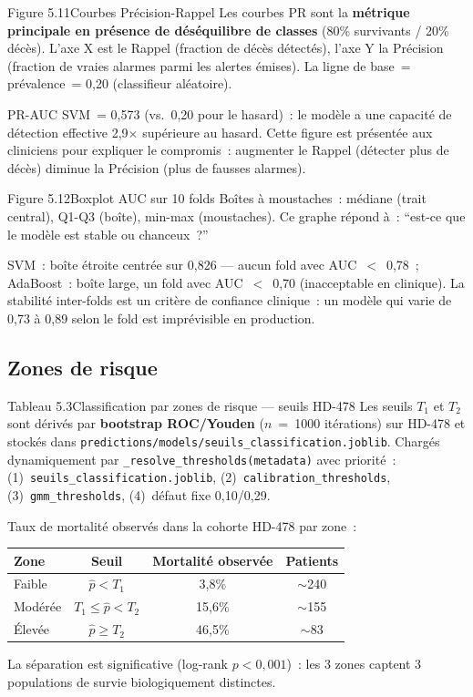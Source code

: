 \documentclass[12pt,a4paper]{article}
\begin{document}
\begin{figbox}{Figure 5.11}{Courbes Précision-Rappel}
Les courbes PR sont la \textbf{métrique principale en présence de déséquilibre
de classes} (80\% survivants / 20\% décès). L'axe X est le Rappel (fraction de
décès détectés), l'axe Y la Précision (fraction de vraies alarmes parmi les
alertes émises). La ligne de base~= prévalence~= 0{,}20 (classifieur aléatoire).

PR-AUC SVM~= 0{,}573 (vs.\ 0{,}20 pour le hasard)~: le modèle a une capacité
de détection effective 2{,}9$\times$ supérieure au hasard. Cette figure est
présentée aux cliniciens pour expliquer le compromis~: augmenter le Rappel
(détecter plus de décès) diminue la Précision (plus de fausses alarmes).
\end{figbox}

\begin{figbox}{Figure 5.12}{Boxplot AUC sur 10 folds}
Boîtes à moustaches~: médiane (trait central), Q1-Q3 (boîte), min-max (moustaches).
Ce graphe répond à~: ``est-ce que le modèle est stable ou chanceux~?''

SVM~: boîte étroite centrée sur 0{,}826 --- aucun fold avec AUC~$<$~0{,}78~;
AdaBoost~: boîte large, un fold avec AUC~$<$~0{,}70 (inacceptable en clinique).
La stabilité inter-folds est un critère de confiance clinique~: un modèle qui
varie de 0{,}73 à 0{,}89 selon le fold est imprévisible en production.
\end{figbox}

\subsection{Zones de risque}

\begin{figbox}{Tableau 5.3}{Classification par zones de risque --- seuils HD-478}
Les seuils $T_1$ et $T_2$ sont dérivés par \textbf{bootstrap ROC/Youden}
($n$~=~1000 itérations) sur HD-478 et stockés dans
\texttt{predictions/models/seuils\_classification.joblib}. Chargés
dynamiquement par \texttt{\_resolve\_thresholds(metadata)} avec priorité~:
(1)~\texttt{seuils\_classification.joblib}, (2)~\texttt{calibration\_thresholds},
(3)~\texttt{gmm\_thresholds}, (4)~défaut fixe 0{,}10/0{,}29.

Taux de mortalité observés dans la cohorte HD-478 par zone~:
\begin{center}
\begin{tabular}{lccc}
\toprule
\textbf{Zone} & \textbf{Seuil} & \textbf{Mortalité observée} & \textbf{Patients} \\
\midrule
Faible & $\hat{p} < T_1$ & 3{,}8\% & $\sim$240 \\
Modérée & $T_1 \leq \hat{p} < T_2$ & 15{,}6\% & $\sim$155 \\
Élevée & $\hat{p} \geq T_2$ & 46{,}5\% & $\sim$83 \\
\bottomrule
\end{tabular}
\end{center}
La séparation est significative (log-rank $p<0{,}001$)~: les 3 zones captent
3 populations de survie biologiquement distinctes.
\end{figbox}
\end{document}
